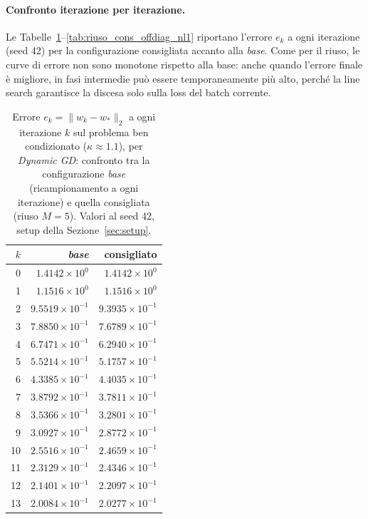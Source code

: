 \paragraph{Confronto iterazione per iterazione.}
Le Tabelle~\ref{tab:riuso_cons_bencond_gd}--\ref{tab:riuso_cons_offdiag_nl1}
riportano l'errore $e_k$ a ogni iterazione (seed 42) per la configurazione
consigliata accanto alla \emph{base}. Come per il riuso, le curve di errore non
sono monotone rispetto alla base: anche quando l'errore finale è migliore, in
fasi intermedie può essere temporaneamente più alto, perché la line search
garantisce la discesa solo sulla loss del batch corrente.

\begin{table}[H]
\centering
\footnotesize
\renewcommand{\arraystretch}{0.85}
\setlength{\tabcolsep}{8pt}
\caption{Errore $e_k=\|w_k-w_*\|_2$ a ogni iterazione $k$ sul problema ben condizionato ($\kappa\approx 1.1$), per \emph{Dynamic GD}: confronto tra la configurazione \emph{base} (ricampionamento a ogni iterazione) e quella consigliata (riuso $M{=}5$). Valori al seed 42, setup della Sezione~\ref{sec:setup}.}
\label{tab:riuso_cons_bencond_gd}
\begin{tabular}{@{}rrr@{}}
\toprule
$k$ & \emph{base} & consigliato\\
\midrule
0 & $1.4142\times10^{0}$ & $1.4142\times10^{0}$\\
1 & $1.1516\times10^{0}$ & $1.1516\times10^{0}$\\
2 & $9.5519\times10^{-1}$ & $9.3935\times10^{-1}$\\
3 & $7.8850\times10^{-1}$ & $7.6789\times10^{-1}$\\
4 & $6.7471\times10^{-1}$ & $6.2940\times10^{-1}$\\
5 & $5.5214\times10^{-1}$ & $5.1757\times10^{-1}$\\
6 & $4.3385\times10^{-1}$ & $4.4035\times10^{-1}$\\
7 & $3.8792\times10^{-1}$ & $3.7811\times10^{-1}$\\
8 & $3.5366\times10^{-1}$ & $3.2801\times10^{-1}$\\
9 & $3.0927\times10^{-1}$ & $2.8772\times10^{-1}$\\
10 & $2.5516\times10^{-1}$ & $2.4659\times10^{-1}$\\
11 & $2.3129\times10^{-1}$ & $2.4346\times10^{-1}$\\
12 & $2.1401\times10^{-1}$ & $2.2097\times10^{-1}$\\
13 & $2.0084\times10^{-1}$ & $2.0277\times10^{-1}$\\

\end{tabular}
\end{table}
